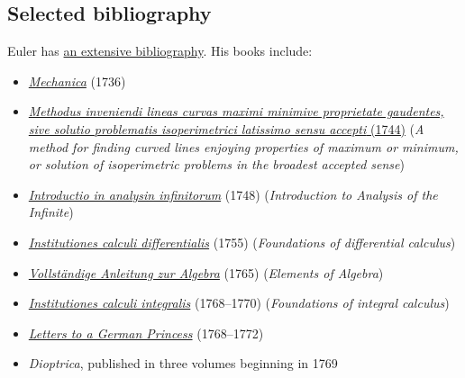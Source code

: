 \subsection{Selected bibliography}\label{Selected_bibliography}

Euler has \href{https://en.wikipedia.org/wiki/Contributions_of_Leonhard_Euler_to_mathematics\#Works}{an extensive bibliography}. His books include:

\begin{itemize}
\tightlist
\item
  {\emph{\href{https://en.wikipedia.org/wiki/Mechanica}{Mechanica}} (1736)}
\item
  {\href{https://www.loc.gov/item/04028085/}{\emph{Methodus inveniendi lineas curvas maximi minimive proprietate gaudentes, sive solutio problematis isoperimetrici latissimo sensu accepti} (1744)} (\emph{A method for finding curved lines enjoying properties of maximum or minimum, or solution of isoperimetric problems in the broadest accepted sense})}
\item
  {\emph{\href{https://en.wikipedia.org/wiki/Introductio_in_analysin_infinitorum}{Introductio in analysin infinitorum}} (1748) (\emph{Introduction to Analysis of the Infinite})}
\item
  {\emph{\href{https://en.wikipedia.org/wiki/Institutiones_calculi_differentialis}{Institutiones calculi differentialis}} (1755) (\emph{Foundations of differential calculus})}
\item
  {\emph{\href{https://en.wikipedia.org/wiki/Elements_of_Algebra}{Vollständige Anleitung zur Algebra}} (1765) (\emph{Elements of Algebra})}
\item
  {\emph{\href{https://en.wikipedia.org/wiki/Institutiones_calculi_integralis}{Institutiones calculi integralis}} (1768--1770) (\emph{Foundations of integral calculus})}
\item
  {\emph{\href{https://en.wikipedia.org/wiki/Letters_to_a_German_Princess}{Letters to a German Princess}} (1768--1772)}
\item
  {\emph{Dioptrica}, published in three volumes beginning in 1769}
\end{itemize}

